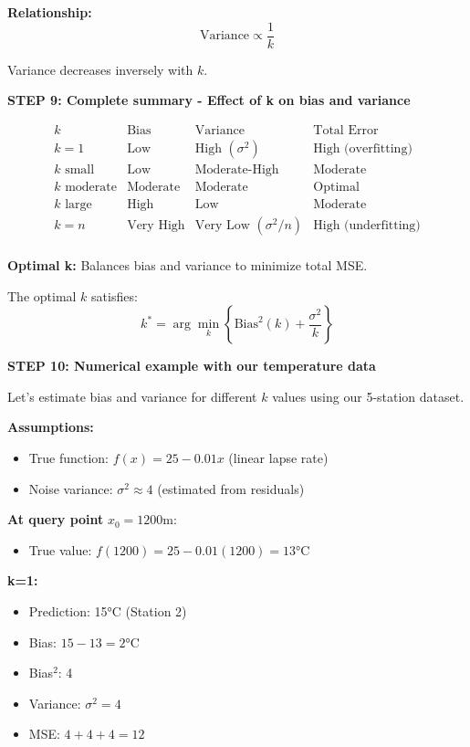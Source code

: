 \documentclass[12pt]{article}
\begin{document}
\begin{solution}
\textbf{Relationship:}
\[
\text{Variance} \propto \frac{1}{k}
\]

Variance decreases inversely with \(k\).

\textbf{STEP 9: Complete summary - Effect of k on bias and variance}

\[
\begin{array}{c|c|c|c}
k & \text{Bias} & \text{Variance} & \text{Total Error} \\
\hline
k=1 & \text{Low} & \text{High } (\sigma^2) & \text{High (overfitting)} \\
k \text{ small} & \text{Low} & \text{Moderate-High} & \text{Moderate} \\
k \text{ moderate} & \text{Moderate} & \text{Moderate} & \text{Optimal} \\
k \text{ large} & \text{High} & \text{Low} & \text{Moderate} \\
k=n & \text{Very High} & \text{Very Low } (\sigma^2/n) & \text{High (underfitting)} \\
\end{array}
\]

\textbf{Optimal k:} Balances bias and variance to minimize total MSE.

The optimal \(k\) satisfies:
\[
k^* = \arg\min_k \left\{\text{Bias}^2(k) + \frac{\sigma^2}{k}\right\}
\]

\textbf{STEP 10: Numerical example with our temperature data}

Let's estimate bias and variance for different \(k\) values using our 5-station dataset.

\textbf{Assumptions:}
\begin{itemize}
    \item True function: \(f(x) = 25 - 0.01x\) (linear lapse rate)
    \item Noise variance: \(\sigma^2 \approx 4\) (estimated from residuals)
\end{itemize}

\textbf{At query point} \(x_0 = 1200\)m:
\begin{itemize}
    \item True value: \(f(1200) = 25 - 0.01(1200) = 13°\)C
\end{itemize}

\textbf{k=1:}
\begin{itemize}
    \item Prediction: 15°C (Station 2)
    \item Bias: \(15 - 13 = 2°\)C
    \item Bias\(^2\): 4
    \item Variance: \(\sigma^2 = 4\)
    \item MSE: \(4 + 4 + 4 = 12\)
\end{itemize}


\end{solution}
\end{document}
